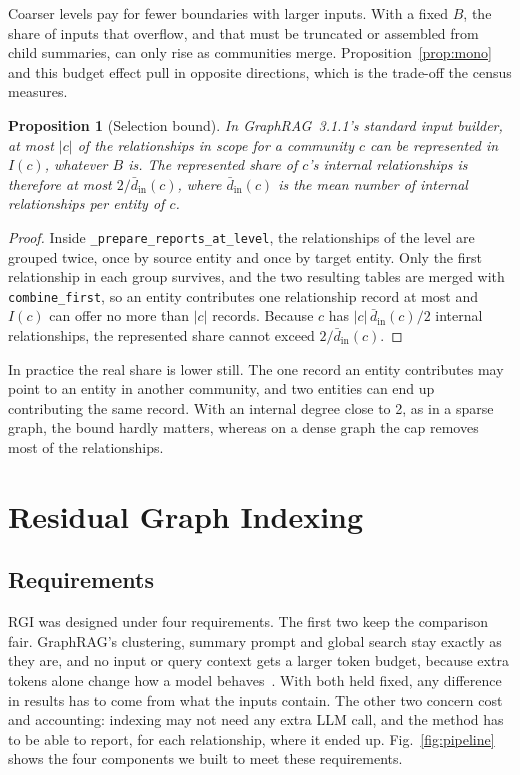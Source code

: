 \documentclass[journal]{IEEEtran}
\newtheorem{proposition}{Proposition}
\theoremstyle{remark}
\newcommand{\In}{I}
\begin{document}
Coarser levels pay for fewer boundaries with larger inputs. With a fixed $B$, the share of inputs that overflow, and that must be truncated or assembled from child summaries, can only rise as communities merge. Proposition~\ref{prop:mono} and this budget effect pull in opposite directions, which is the trade-off the census measures.

\begin{proposition}[Selection bound]\label{prop:select}
In GraphRAG~3.1.1's standard input builder, at most $|c|$ of the relationships in scope for a community $c$ can be represented in $\In(c)$, whatever $B$ is. The represented share of $c$'s internal relationships is therefore at most $2/\bar d_{\mathrm{in}}(c)$, where $\bar d_{\mathrm{in}}(c)$ is the mean number of internal relationships per entity of $c$.
\end{proposition}
\begin{proof}
Inside \texttt{\_prepare\_reports\_at\_level}, the relationships of the level are grouped twice, once by source entity and once by target entity. Only the first relationship in each group survives, and the two resulting tables are merged with \texttt{combine\_first}, so an entity contributes one relationship record at most and $\In(c)$ can offer no more than $|c|$ records. Because $c$ has $|c|\,\bar d_{\mathrm{in}}(c)/2$ internal relationships, the represented share cannot exceed $2/\bar d_{\mathrm{in}}(c)$.
\end{proof}

In practice the real share is lower still. The one record an entity contributes may point to an entity in another community, and two entities can end up contributing the same record. With an internal degree close to 2, as in a sparse graph, the bound hardly matters, whereas on a dense graph the cap removes most of the relationships.


\section{Residual Graph Indexing}\label{sec:rgi}

\subsection{Requirements}
RGI was designed under four requirements. The first two keep the comparison fair. GraphRAG's clustering, summary prompt and global search stay exactly as they are, and no input or query context gets a larger token budget, because extra tokens alone change how a model behaves~\cite{liu2024lost}. With both held fixed, any difference in results has to come from what the inputs contain. The other two concern cost and accounting: indexing may not need any extra LLM call, and the method has to be able to report, for each relationship, where it ended up. Fig.~\ref{fig:pipeline} shows the four components we built to meet these requirements.
\end{document}
